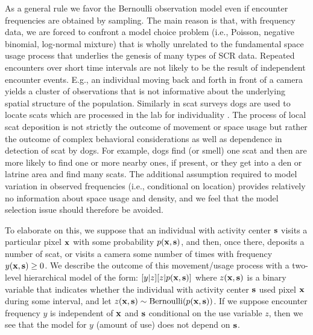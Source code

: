 As a general rule we favor the Bernoulli observation model even if
encounter frequencies are obtained by sampling.  The main reason is
that, with frequency data, we are forced to confront a model choice
problem (i.e., Poisson, negative binomial, log-normal mixture) that is
wholly unrelated to the fundamental space usage process that underlies
the genesis  %
of many types of SCR data. 
Repeated encounters over short time intervals
are not likely to be the result of independent encounter events. E.g.,
an individual moving back and forth in front of a camera yields a
cluster of observations that is not informative about the underlying
spatial structure of the population. Similarly in scat surveys dogs
are used to locate scats which are processed in the lab for
individuality \citep{kohn_etal:1999, mackay_etal:2008,
  thompson_etal:2012}.  The process of local scat deposition is not
strictly the outcome of movement or space usage but rather the outcome
of complex behavioral considerations as well as dependence in
detection of scat by dogs. 
For example, dogs find (or smell) one scat and
then are more likely to find one or more nearby ones, if present, or
they get into a den or latrine area and find many scats.  The
additional assumption required to model variation in observed
frequencies (i.e., conditional on location) provides relatively no
information about space usage and density, and we feel that the model
selection issue should therefore be avoided.

To elaborate on this, we suppose that an individual with activity
center ${\bf s}$ visits a
particular pixel ${\bf x}$
with some probability $p({\bf x}, {\bf
  s})$, and then, once there, deposits a number of scat, or visits
a camera some number of times with frequency $y({\bf x},{\bf s}) \ge
0$.  We describe the outcome of this movement/usage process with a two-level
hierarchical model of the form: $[y|z][z|p({\bf x},{\bf s})]$ where
$z({\bf x},{\bf s})$ is a binary variable that indicates whether the
individual with activity center ${\bf s}$ used pixel ${\bf x}$
during some interval, and let $z({\bf x},{\bf s}) \sim
\mbox{Bernoulli}(p({\bf x},{\bf s}))$. If we suppose  encounter frequency
$y$ is independent of ${\bf x}$ and ${\bf s}$ conditional on the
use variable  $z$, then  we see that
the model for $y$ (amount of use) does not depend on ${\bf s}$.


